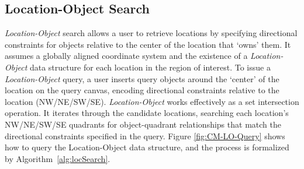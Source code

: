\subsection{Location-Object Search}
\par{


    \textit{Location-Object} search allows a user to retrieve locations by specifying directional constraints for objects relative to the center of the location that `owns' them. 
    It assumes a globally aligned coordinate system and the existence of a \textit{Location-Object} data structure for each location in the region of interest.
    To issue a \textit{Location-Object} query, a user inserts query objects around the `center' of the location on the query canvas, encoding directional constraints relative to the location (NW/NE/SW/SE). 
    \textit{Location-Object} works effectively as a set intersection operation. It iterates through the candidate locations, searching each location's NW/NE/SW/SE quadrants for object-quadrant relationships that match the directional constraints specified in the query.
    Figure \ref{fig:CM-LO-Query} shows how to query the Location-Object data structure, and the process is formalized by Algorithm~\ref{alg:locSearch}.
}
